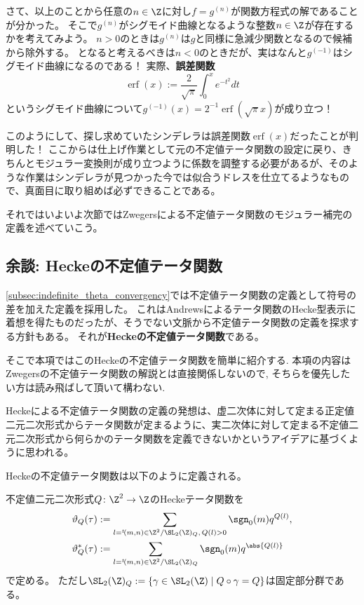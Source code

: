 \documentclass[11pt,b5paper,oneside,lualatex]{ltjsarticle} %
\DeclareMathOperator{\erf}{erf}
\numberwithin{equation}{section} %
\begin{document}
さて、以上のことから任意の$ n \in \Z $に対し$ f = g^{(n)} $が関数方程式の解であることが分かった。
そこで$ g^{(n)} $がシグモイド曲線となるような整数$ n \in \Z $が存在するかを考えてみよう。
$ n>0 $のときは$ g^{(n)} $は$ g $と同様に急減少関数となるので候補から除外する。
となると考えるべきは$ n < 0 $のときだが、実はなんと$ g^{(-1)} $はシグモイド曲線になるのである！
実際、\textbf{誤差関数}
\[
\erf(x) := \frac{2}{\sqrt{\pi}} \int_{0}^{x} e^{-t^2} dt
\]
というシグモイド曲線について$ g^{(-1)} (x) = 2^{-1} \erf(\sqrt{\pi} x) $が成り立つ！

このようにして、探し求めていたシンデレラは誤差関数$ \erf(x) $だったことが判明した！
ここからは仕上げ作業として元の不定値テータ関数の設定に戻り、きちんとモジュラー変換則が成り立つように係数を調整する必要があるが、そのような作業はシンデレラが見つかった今では似合うドレスを仕立てるようなもので、真面目に取り組めば必ずできることである。

それではいよいよ次節ではZwegersによる不定値テータ関数のモジュラー補完の定義を述べていこう。




\subsection{余談: Heckeの不定値テータ関数} \label{subsec:Hecke_theta}


\cref{subsec:indefinite_theta_convergency}では不定値テータ関数の定義として符号の差を加えた定義を採用した。
これはAndrewsによるテータ関数のHecke型表示に着想を得たものだったが、そうでない文脈から不定値テータ関数の定義を探求する方針もある。
それが\textbf{Heckeの不定値テータ関数}である。

そこで本項ではこのHeckeの不定値テータ関数を簡単に紹介する. 
本項の内容はZwegersの不定値テータ関数の解説とは直接関係しないので, そちらを優先したい方は読み飛ばして頂いて構わない. 

Heckeによる不定値テータ関数の定義の発想は、虚二次体に対して定まる正定値二元二次形式からテータ関数が定まるように、実二次体に対して定まる不定値二元二次形式から何らかのテータ関数を定義できないかというアイデアに基づくように思われる。

Heckeの不定値テータ関数は以下のように定義される。

\begin{dfn}
	不定値二元二次形式$ Q \colon \Z^2 \to \Z $のHeckeテータ関数を
	\begin{align}
		\vartheta_Q (\tau) 
		&:=
		\sum_{l = {}^t\!(m, n) \in \Z^2 / \SL_2(\Z)_Q, \, Q(l) > 0} \sgn_0(m) q^{Q(l)}, 
		\\
		\vartheta_Q^* (\tau)
		&:=
		\sum_{l = {}^t\!(m, n) \in \Z^2 / \SL_2(\Z)_Q} \sgn_0(m) q^{\abs{Q(l)}}
	\end{align}
	で定める。
	ただし$ \SL_2(\Z)_Q := \{ \gamma \in \SL_2(\Z) \mid Q \circ \gamma = Q \} $は固定部分群である。
\end{dfn}
\end{document}

